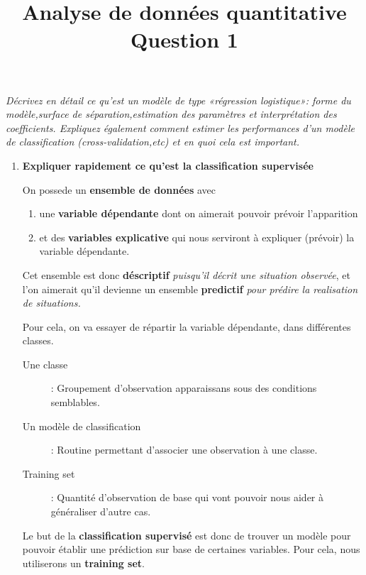\documentclass[a4paper, 11pt, onecolumn]{article}
\title{Analyse de données quantitative\\Question 1}
\date{}
\begin{document}
\maketitle

\textit{Décrivez en détail ce qu’est un modèle de type «régression logistique»: forme du modèle,surface de séparation,estimation des paramètres et interprétation des coefficients. Expliquez également comment estimer les performances d’un modèle de classification (cross-validation,etc) et en quoi cela est important.}

\begin{enumerate}

\item \textbf{Expliquer rapidement ce qu'est la classification supervisée} 

  On possede un \textbf{ensemble de données} avec 
  
  \begin{enumerate}
    \item {une \textbf{variable dépendante} dont on aimerait pouvoir prévoir l'apparition}
    \item {et des \textbf{variables explicative} qui nous serviront à expliquer (prévoir) la variable dépendante.}
  \end{enumerate}
  
  Cet ensemble est donc \textbf{déscriptif} \textit{puisqu'il décrit une situation observée}, et l'on aimerait qu'il devienne un ensemble\textbf{ predictif} \textit{pour prédire la realisation de situations.}

Pour cela, on va essayer de répartir la variable dépendante, dans différentes classes.

\begin{framed}
  \begin{description}
    \item[Une classe] : Groupement d'observation apparaissans sous des
      conditions semblables.
    \item[Un modèle de classification ] : Routine permettant d'associer une observation
      à une classe.
    \item[Training set ] : Quantité d'observation de base qui vont pouvoir nous aider à 
      généraliser d'autre cas.
    \end{description}
  \end{framed}

  Le but de la \textbf{classification supervisé} est donc de trouver un modèle
  pour pouvoir établir une prédiction sur base de certaines variables. 
  Pour cela, nous utiliserons un \textbf{training set}.


\end{enumerate}
\end{document}
